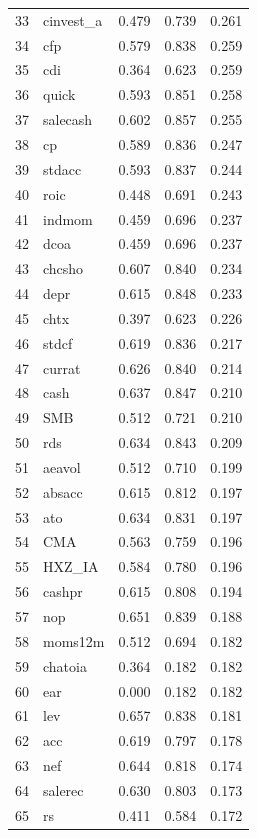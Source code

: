 \begin{footnotesize}
\begin{longtable}{rl|c|c|c}
		33 & cinvest\_a & 0.479 & 0.739 & 0.261 \\ 
		34 & cfp & 0.579 & 0.838 & 0.259 \\ 
		35 & cdi & 0.364 & 0.623 & 0.259 \\ 
		36 & quick & 0.593 & 0.851 & 0.258 \\ 
		37 & salecash & 0.602 & 0.857 & 0.255 \\ 
		38 & cp & 0.589 & 0.836 & 0.247 \\ 
		39 & stdacc & 0.593 & 0.837 & 0.244 \\ 
		40 & roic & 0.448 & 0.691 & 0.243 \\ 
		41 & indmom & 0.459 & 0.696 & 0.237 \\ 
		42 & dcoa & 0.459 & 0.696 & 0.237 \\ 
		43 & chcsho & 0.607 & 0.840 & 0.234 \\ 
		44 & depr & 0.615 & 0.848 & 0.233 \\ 
		45 & chtx & 0.397 & 0.623 & 0.226 \\ 
		46 & stdcf & 0.619 & 0.836 & 0.217 \\ 
		47 & currat & 0.626 & 0.840 & 0.214 \\ 
		48 & cash & 0.637 & 0.847 & 0.210 \\ 
		49 & SMB & 0.512 & 0.721 & 0.210 \\ 
		50 & rds & 0.634 & 0.843 & 0.209 \\ 
		51 & aeavol & 0.512 & 0.710 & 0.199 \\ 
		52 & absacc & 0.615 & 0.812 & 0.197 \\ 
		53 & ato & 0.634 & 0.831 & 0.197 \\ 
		54 & CMA & 0.563 & 0.759 & 0.196 \\ 
		55 & HXZ\_IA & 0.584 & 0.780 & 0.196 \\ 
		56 & cashpr & 0.615 & 0.808 & 0.194 \\ 
		57 & nop & 0.651 & 0.839 & 0.188 \\ 
		58 & moms12m & 0.512 & 0.694 & 0.182 \\ 
		59 & chatoia & 0.364 & 0.182 & 0.182 \\ 
		60 & ear & 0.000 & 0.182 & 0.182 \\ 
		61 & lev & 0.657 & 0.838 & 0.181 \\ 
		62 & acc & 0.619 & 0.797 & 0.178 \\ 
		63 & nef & 0.644 & 0.818 & 0.174 \\ 
		64 & salerec & 0.630 & 0.803 & 0.173 \\ 
		65 & rs & 0.411 & 0.584 & 0.172 \\ 

\end{longtable}
\end{footnotesize}
